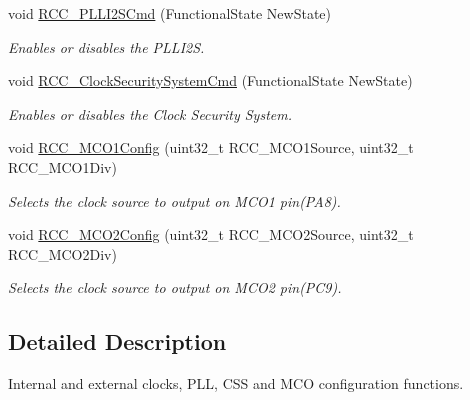 \begin{DoxyCompactItemize}
void \hyperlink{group___r_c_c___group1_ga2efe493a6337d5e0034bfcdfb0f541e4}{R\+C\+C\+\_\+\+P\+L\+L\+I2\+S\+Cmd} (Functional\+State New\+State)
\begin{DoxyCompactList}\small\item\em Enables or disables the P\+L\+L\+I2S. \end{DoxyCompactList}\item 
void \hyperlink{group___r_c_c___group1_ga0ff1fd7b9a8a49cdda11b7d7261c3494}{R\+C\+C\+\_\+\+Clock\+Security\+System\+Cmd} (Functional\+State New\+State)
\begin{DoxyCompactList}\small\item\em Enables or disables the Clock Security System. \end{DoxyCompactList}\item 
void \hyperlink{group___r_c_c___group1_ga15c9ecb6ef015ed008cb28e5b7a50531}{R\+C\+C\+\_\+\+M\+C\+O1\+Config} (uint32\+\_\+t R\+C\+C\+\_\+\+M\+C\+O1\+Source, uint32\+\_\+t R\+C\+C\+\_\+\+M\+C\+O1\+Div)
\begin{DoxyCompactList}\small\item\em Selects the clock source to output on M\+C\+O1 pin(\+P\+A8). \end{DoxyCompactList}\item 
void \hyperlink{group___r_c_c___group1_gaf50f10675b747de60c739e44e5c22aee}{R\+C\+C\+\_\+\+M\+C\+O2\+Config} (uint32\+\_\+t R\+C\+C\+\_\+\+M\+C\+O2\+Source, uint32\+\_\+t R\+C\+C\+\_\+\+M\+C\+O2\+Div)
\begin{DoxyCompactList}\small\item\em Selects the clock source to output on M\+C\+O2 pin(\+P\+C9). \end{DoxyCompactList}\end{DoxyCompactItemize}


\subsection{Detailed Description}
Internal and external clocks, P\+LL, C\+SS and M\+CO configuration functions. 

